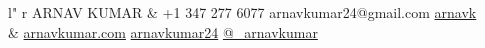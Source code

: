 \documentclass[11pt, letter]{article}
\begin{document}
%
\begin{adjustbox}{width=1.03\textwidth,center}
\begin{tabular}{ l" r }
  {
    {\titlefont\fontsize{35pt}{22pt}\selectfont
      ARNAV KUMAR
    }
  }
&
\faMobilePhone { }+1 347 277 6077 \textbullet{}
\faEnvelope { }arnavkumar24@gmail.com \textbullet{}
\faGithub { }\href{https://github.com/arnavk}{arnavk}
\\
&
\faExternalLink { }\href{http://arnavkumar.com}{arnavkumar.com} \textbullet{}
\faLinkedin { }\href{http://sg.linkedin.com/in/arnavkumar24/}{arnavkumar24} \textbullet{}
\faTwitter { }\href{http://twitter.com/\_arnavkumar}{@\_arnavkumar}
\\
\end{tabular}
\end{adjustbox}

\begin{raggedright}
\vspace{5mm}


\end{raggedright}
\end{document}
